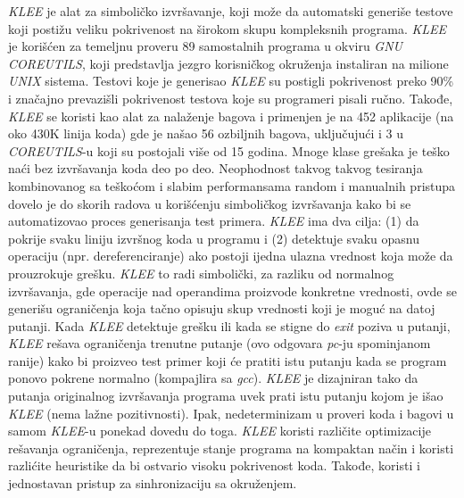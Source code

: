 \documentclass[a4paper]{article}
\begin{document}
{\textit {KLEE} je alat za simboličko izvršavanje, koji može da automatski generiše testove koji postižu veliku pokrivenost na širokom skupu kompleksnih programa. \textit{KLEE} je korišćen za temeljnu proveru 89 samostalnih programa u okviru \textit{GNU COREUTILS}, koji predstavlja jezgro korisničkog okruženja instaliran na milione \textit{UNIX} sistema. Testovi koje je generisao \textit {KLEE} su postigli pokrivenost preko 90\% i značajno prevazišli pokrivenost testova koje su programeri pisali ručno. Takođe, \textit{KLEE} se koristi kao alat za nalaženje bagova i primenjen je na 452 aplikacije (na oko 430K linija koda) gde je našao 56 ozbiljnih bagova, uključujući i 3 u \textit{COREUTILS}-u koji su postojali više od 15 godina.
Mnoge klase grešaka je teško naći bez izvršavanja koda deo po deo. Neophodnost takvog takvog tesiranja kombinovanog sa teškoćom i slabim performansama random i manualnih pristupa dovelo je do skorih radova u korišćenju simboličkog izvršavanja kako bi se automatizovao proces generisanja test primera. \textit{KLEE} ima dva cilja:
(1) da pokrije svaku liniju izvršnog koda u programu i (2) detektuje svaku opasnu operaciju (npr. dereferenciranje) ako postoji ijedna ulazna vrednost koja može da prouzrokuje grešku. \textit{KLEE} to radi simbolički, za razliku od normalnog izvršavanja, gde operacije nad operandima proizvode konkretne vrednosti, ovde se generišu ograničenja koja tačno opisuju skup vrednosti koji je moguć na datoj putanji. Kada \textit{KLEE} detektuje grešku ili kada se stigne do \textit{exit} poziva u putanji, \textit{KLEE} rešava ograničenja trenutne putanje (ovo odgovara \textit{pc}-ju spominjanom ranije) kako bi proizveo test primer koji će pratiti istu putanju kada se program ponovo pokrene normalno (kompajlira sa \textit{gcc}). \textit{KLEE} je dizajniran tako da putanja originalnog izvršavanja programa uvek prati istu putanju kojom je išao \textit{KLEE} (nema lažne pozitivnosti). Ipak, nedeterminizam u proveri koda i bagovi u samom \textit{KLEE}-u ponekad dovedu do toga. \textit{KLEE} koristi različite optimizacije rešavanja ograničenja, reprezentuje stanje programa na kompaktan način i koristi razlićite heuristike da bi ostvario visoku pokrivenost koda. Takođe, koristi i jednostavan pristup za sinhronizaciju sa okruženjem.

}
\end{document}
